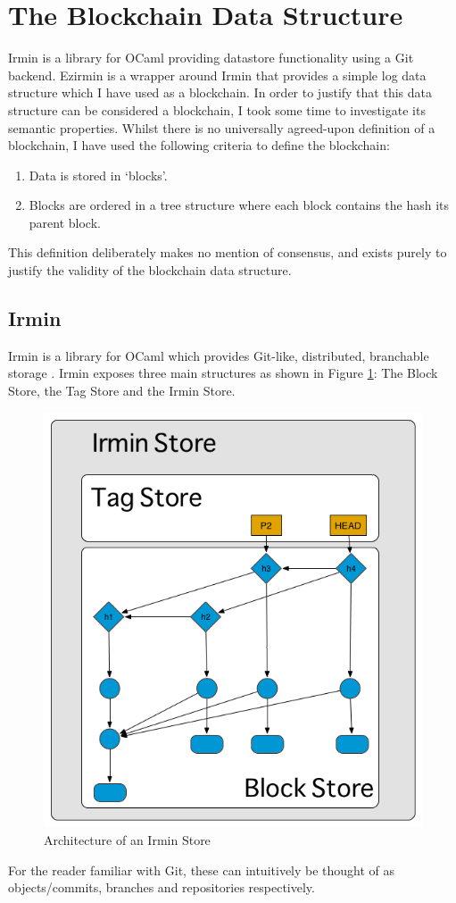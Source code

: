 \documentclass[12pt,a4paper,twoside,openright]{report}
\begin{document}
	\section{The Blockchain Data Structure}\label{sec:datastructure}
	Irmin is a library for OCaml providing datastore functionality using a Git backend.
	Ezirmin is a wrapper around Irmin that provides a simple log data structure which I have used as a blockchain.
	In order to justify that this data structure can be considered a blockchain, I took some time to investigate its semantic properties. 
	Whilst there is no universally agreed-upon definition of a blockchain, I have used the following criteria to define the blockchain:
	\begin{enumerate}
		\item Data is stored in `blocks'.
		\item Blocks are ordered in a tree structure where each block contains the hash its parent block.
	\end{enumerate}
	This definition deliberately makes no mention of consensus, and exists purely to justify the validity of the blockchain data structure.
	\subsection{Irmin}
	Irmin is a library for OCaml which provides Git-like, distributed, branchable storage \cite{Irmin}. 
	Irmin exposes three main structures as shown in Figure \ref{fig:IrminBlockStore}: The Block Store, the Tag Store and the Irmin Store.
	\begin{figure}
		\begin{center}
		\includegraphics[width=13cm]{figs/irmin-stores.png}
		\caption{Architecture of an Irmin Store}
		\label{fig:IrminBlockStore}
		\end{center}
	\end{figure}
	For the reader familiar with Git, these can intuitively be thought of as objects/commits, branches and repositories respectively.
\end{document}
